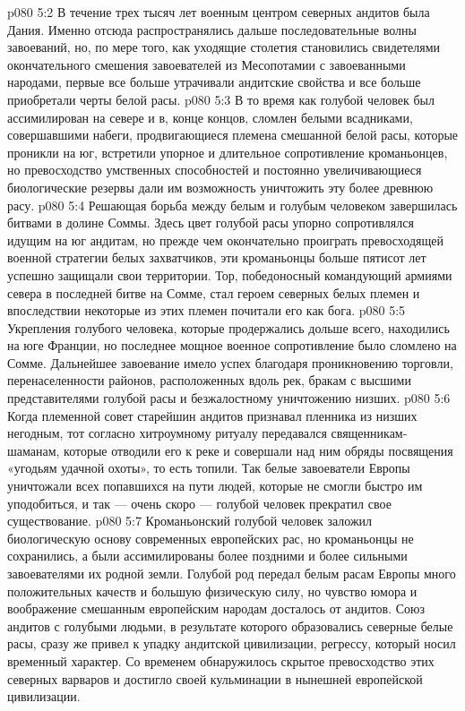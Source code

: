 \vs p080 5:2 В течение трех тысяч лет военным центром северных андитов была Дания. Именно отсюда распространялись дальше последовательные волны завоеваний, но, по мере того, как уходящие столетия становились свидетелями окончательного смешения завоевателей из Месопотамии с завоеванными народами, первые все больше утрачивали андитские свойства и все больше приобретали черты белой расы.
\vs p080 5:3 \pc В то время как голубой человек был ассимилирован на севере и в, конце концов, сломлен белыми всадниками, совершавшими набеги, продвигающиеся племена смешанной белой расы, которые проникли на юг, встретили упорное и длительное сопротивление кроманьонцев, но превосходство умственных способностей и постоянно увеличивающиеся биологические резервы дали им возможность уничтожить эту более древнюю расу.
\vs p080 5:4 Решающая борьба между белым и голубым человеком завершилась битвами в долине Соммы. Здесь цвет голубой расы упорно сопротивлялся идущим на юг андитам, но прежде чем окончательно проиграть превосходящей военной стратегии белых захватчиков, эти кроманьонцы больше пятисот лет успешно защищали свои территории. Тор, победоносный командующий армиями севера в последней битве на Сомме, стал героем северных белых племен и впоследствии некоторые из этих племен почитали его как бога.
\vs p080 5:5 \pc Укрепления голубого человека, которые продержались дольше всего, находились на юге Франции, но последнее мощное военное сопротивление было сломлено на Сомме. Дальнейшее завоевание имело успех благодаря проникновению торговли, перенаселенности районов, расположенных вдоль рек, бракам с высшими представителями голубой расы и безжалостному уничтожению низших.
\vs p080 5:6 Когда племенной совет старейшин андитов признавал пленника из низших негодным, тот согласно хитроумному ритуалу передавался священникам\hyp{}шаманам, которые отводили его к реке и совершали над ним обряды посвящения «угодьям удачной охоты», то есть топили. Так белые завоеватели Европы уничтожали всех попавшихся на пути людей, которые не смогли быстро им уподобиться, и так --- очень скоро --- голубой человек прекратил свое существование.
\vs p080 5:7 \pc Кроманьонский голубой человек заложил биологическую основу современных европейских рас, но кроманьонцы не сохранились, а были ассимилированы более поздними и более сильными завоевателями их родной земли. Голубой род передал белым расам Европы много положительных качеств и большую физическую силу, но чувство юмора и воображение смешанным европейским народам досталось от андитов. Союз андитов с голубыми людьми, в результате которого образовались северные белые расы, сразу же привел к упадку андитской цивилизации, регрессу, который носил временный характер. Со временем обнаружилось скрытое превосходство этих северных варваров и достигло своей кульминации в нынешней европейской цивилизации.
